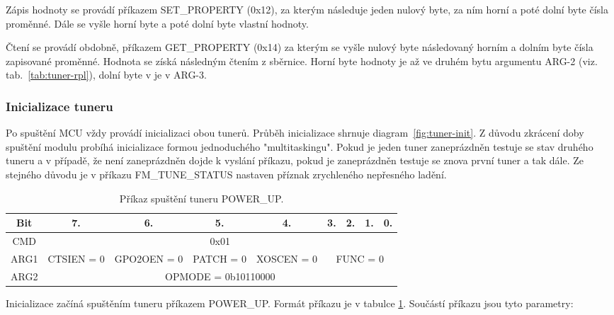 Zápis hodnoty se provádí příkazem SET\_PROPERTY (0x12), za kterým následuje jeden nulový byte, za ním horní a poté dolní byte čísla proměnné. Dále se vyšle horní byte a poté dolní byte vlastní hodnoty. 

Čtení se provádí obdobně, příkazem GET\_PROPERTY (0x14) za kterým se vyšle nulový byte následovaný horním a dolním byte čísla zapisované proměnné. Hodnota se získá následným čtením z \iic sběrnice. Horní byte hodnoty je až ve druhém bytu argumentu ARG-2 (viz. tab.~\ref{tab:tuner-rpl}), dolní byte v je v ARG-3.


\subsubsection{Inicializace tuneru}
\label{subsubsec:tun-init}

Po spuštění MCU vždy provádí inicializaci obou tunerů. Průběh inicializace shrnuje diagram~\ref{fig:tuner-init}. Z důvodu zkrácení doby spuštění modulu probíhá inicializace formou jednoduchého "multitaskingu". Pokud je jeden tuner zaneprázdněn testuje se stav druhého tuneru a v případě, že není zaneprázdněn dojde k vyslání příkazu, pokud je zaneprázdněn testuje se znova první  tuner a tak dále. Ze stejného důvodu je v příkazu FM\_TUNE\_STATUS nastaven příznak zrychleného nepřesného ladění.


\begin{table}[ht!]
\begin{center}
\begin{tabular}{|c|c|c|c|c|c|c|c|c|}
\hline 
Bit & 7. & 6. & 5. & 4. & 3. & 2. & 1. & 0. \\ 
\hline 
CMD & \multicolumn{8}{c|}{0x01} \\ 
\hline 
ARG1 & CTSIEN = 0 & GPO2OEN = 0 & PATCH = 0 & XOSCEN = 0 & \multicolumn{4}{c|}{FUNC = 0} \\ 
\hline 
ARG2 & \multicolumn{8}{c|}{OPMODE = 0b10110000} \\ 
\hline 
\end{tabular} 
\end{center}
\caption{Příkaz spuštění tuneru POWER\_UP.}
\label{tab:tuner-power-up} 
\end{table}

Inicializace začíná spuštěním tuneru příkazem POWER\_UP. Formát příkazu je v tabulce \ref{tab:tuner-power-up}. Součástí příkazu jsou tyto parametry:

